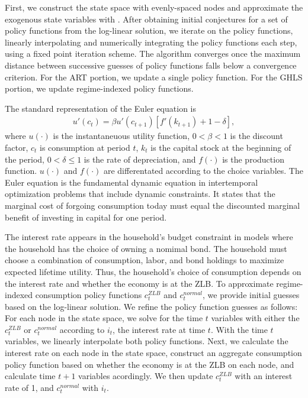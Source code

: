 \documentclass[12pt, final]{article}
\begin{document}
First, we construct the state space with evenly-spaced nodes and approximate the exogenous state variables with \hyperlink{Rouwenhorst}{\color{black}{Rouwenhorst (1995)}}. After obtaining initial conjectures for a set of policy functions from the log-linear solution, we iterate on the policy functions, linearly interpolating and numerically integrating the policy functions each step, using a fixed point iteration scheme. The algorithm converges once the maximum distance between successive guesses of policy functions falls below a convergence criterion. For the ART portion, we update a single policy function. For the GHLS portion, we update regime-indexed policy functions.

The standard representation of the Euler equation is
\begin{gather*}
u'(c_t)  = \beta u'(c_{t+1})[f'(k_{t+1}) + 1 - \delta],
\end{gather*}
where $u(\cdot)$ is the instantaneuous utility function, $0<\beta<1$ is the discount factor, $c_t$ is consumption at period $t$, $k_t$ is the capital stock at the beginning of the period, $0 < \delta \leq 1$ is the rate of depreciation, and $f(\cdot)$ is the production function. $u(\cdot)$ and $f(\cdot)$ are differentated according to the choice variables. The Euler equation is the fundamental dynamic equation in intertemporal optimization problems that include dynamic constraints. It states that the marginal cost of forgoing consumption today must equal the discounted marginal benefit of investing in capital for one period.   %

The interest rate appears in the household's budget constraint in models where the household has the choice of owning a nomimal bond. The household must choose a combination of consumption, labor, and bond holdings to maximize expected lifetime utility. Thus, the household's choice of consumption depends on the interest rate and whether the economy is at the ZLB. To approximate regime-indexed consumption policy functions $c_t^{ZLB}$ and $c_t^{normal}$, we provide initial guesses based on the log-linear solution. We refine the policy function guesses as follows: For each node in the state space, we solve for the time $t$ variables with either the $c_t^{ZLB}$  or $c_t^{normal}$ according to $i_t$, the interest rate at time $t$. With the time $t$ variables, we linearly interpolate both policy functions. Next, we calculate the interest rate on each node in the state space, construct an aggregate consumption policy function based on whether the economy is at the ZLB on each node, and calculate time $t+1$ variables acordingly. We then update $c_t^{ZLB}$ with an interest rate of 1, and $c_t^{normal}$ with $i_t$.
\end{document}
